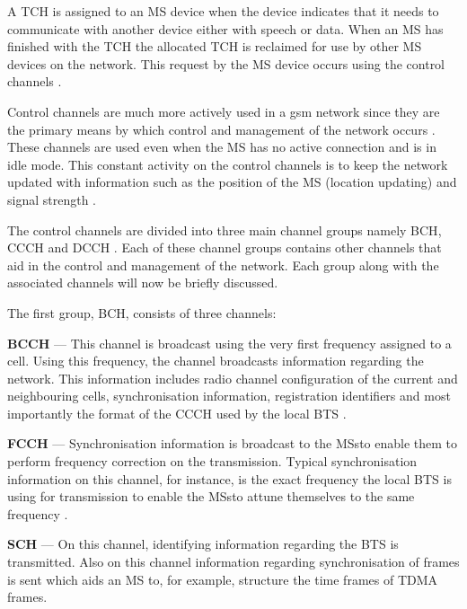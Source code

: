 A \gls{TCH} is assigned to an \gls{MS} device when the device indicates that it needs to communicate with another device either with speech or data. When an \gls{MS} has finished with the \gls{TCH} the allocated \gls{TCH} is reclaimed for use by other \gls{MS} devices on the network. This request by the \gls{MS} device occurs using the control channels \cite{GSMArchitectureProtocolsServices}.

Control channels are much more actively used in a \gls{gsm} network since they are the primary means by which control and management of the network occurs \cite{GSMArchitectureProtocolsServices}. These channels are used even when the \gls{MS} has no active connection and is in idle mode. This constant activity on the control channels is to keep the network updated with information such as the position of the \gls{MS} (location updating) and signal strength \cite{GSMArchitectureProtocolsServices,GSMSysEngin,Eisenblatter}. 

The control channels are divided into three main channel groups namely \gls{BCH}, \gls{CCCH} and \gls{DCCH} \cite{GSMArchitectureProtocolsServices}. Each of these channel groups contains other channels that aid in the control and management of the network. Each group along with the associated channels will now be briefly discussed.

The first group, \gls{BCH}, consists of three channels:
\begin{description}
  \item{\textbf{\gls{BCCH}}} --- This channel is broadcast using the very first frequency assigned to a cell. Using this frequency, the channel broadcasts information regarding the network. This information includes radio channel configuration of the current and neighbouring cells, synchronisation information, registration identifiers and most importantly the format of the \gls{CCCH} used by the local \gls{BTS} \cite{GSMArchitectureProtocolsServices}.
  \item{\textbf{\gls{FCCH}}} --- Synchronisation information is broadcast to the \glspl{MS}to enable them to perform frequency correction on the transmission. Typical synchronisation information on this channel, for instance, is the exact frequency the local \gls{BTS} is using for transmission to enable the \glspl{MS}to attune themselves to the same frequency \cite{GSMArchitectureProtocolsServices}.
  \item{\textbf{\gls{SCH}}} --- On this channel, identifying information regarding the \gls{BTS} is transmitted. Also on this channel information regarding synchronisation of frames is sent which aids an \gls{MS} to, for example, structure the time frames of \gls{TDMA} frames.
\end{description}

